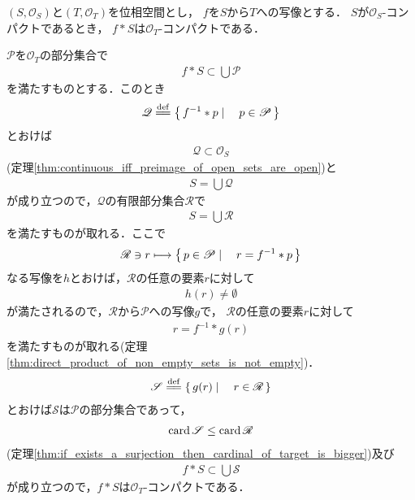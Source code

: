 	\begin{screen}
		\begin{thm}[コンパクト集合の連続写像による像はコンパクト]
			$(S,\mathscr{O}_{S})$と$(T,\mathscr{O}_{T})$を位相空間とし，
			$f$を$S$から$T$への写像とする．
			$S$が$\mathscr{O}_{S}$-コンパクトであるとき，
			$f \ast S$は$\mathscr{O}_{T}$-コンパクトである．
		\end{thm}
	\end{screen}
	
	\begin{sketch}
		$\mathscr{P}$を$\mathscr{O}_{T}$の部分集合で
		\begin{align}
			f \ast S \subset \bigcup \mathscr{P}
		\end{align}
		を満たすものとする．このとき
		\begin{align}
			\mathscr{Q} \defeq \Set{f^{-1} \ast p}{p \in \mathscr{P}}
		\end{align}
		とおけば
		\begin{align}
			\mathscr{Q} \subset \mathscr{O}_{S}
		\end{align}
		(定理\ref{thm:continuous_iff_preimage_of_open_sets_are_open})と
		\begin{align}
			S = \bigcup \mathscr{Q}
		\end{align}
		が成り立つので，$\mathscr{Q}$の有限部分集合$\mathscr{R}$で
		\begin{align}
			S = \bigcup \mathscr{R}
		\end{align}
		を満たすものが取れる．ここで
		\begin{align}
			\mathscr{R} \ni r \longmapsto \left\{\, p \in \mathscr{P} \mid \quad r = f^{-1} \ast p\, \right\}
		\end{align}
		なる写像を$h$とおけば，$\mathscr{R}$の任意の要素$r$に対して
		\begin{align}
			h(r) \neq \emptyset
		\end{align}
		が満たされるので，$\mathscr{R}$から$\mathscr{P}$への写像$g$で，
		$\mathscr{R}$の任意の要素$r$に対して
		\begin{align}
			r = f^{-1} \ast g(r)
		\end{align}
		を満たすものが取れる(定理\ref{thm:direct_product_of_non_empty_sets_is_not_empty})．
		\begin{align}
			\mathscr{S} \defeq \Set{g(r)}{r \in \mathscr{R}}
		\end{align}
		とおけば$\mathscr{S}$は$\mathscr{P}$の部分集合であって，
		\begin{align}
			\operatorname{card} \mathscr{S} \leq \operatorname{card} \mathscr{R}
		\end{align}
		(定理\ref{thm:if_exists_a_surjection_then_cardinal_of_target_is_bigger})及び
		\begin{align}
			f \ast S \subset \bigcup \mathscr{S}
		\end{align}
		が成り立つので，$f \ast S$は$\mathscr{O}_{T}$-コンパクトである．
		\QED
	\end{sketch}
	

